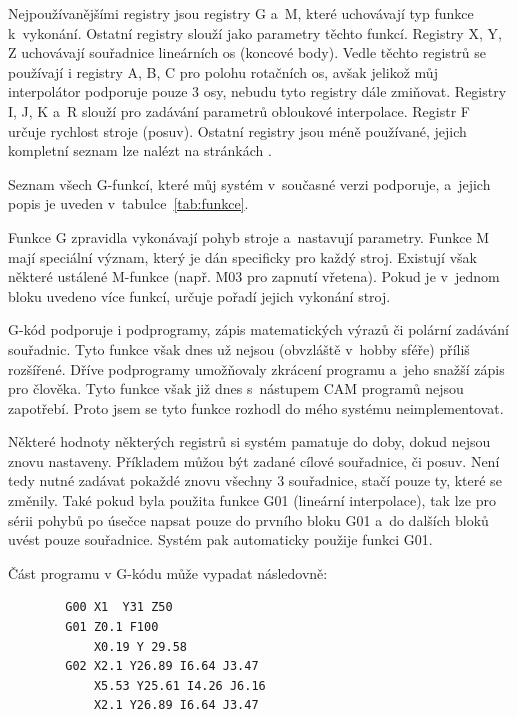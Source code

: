 		Nejpoužívanějšími registry jsou registry G a~M, které uchovávají typ funkce k~vykonání. Ostatní registry slouží jako parametry těchto funkcí. Registry X, Y, Z uchovávají souřadnice lineárních os (koncové body). Vedle těchto registrů se používají i registry A, B, C pro polohu rotačních os, avšak jelikož můj interpolátor podporuje pouze 3 osy, nebudu tyto registry dále zmiňovat. Registry I, J, K a~R slouží pro zadávání parametrů obloukové interpolace. Registr F určuje rychlost stroje (posuv). Ostatní registry jsou méně používané, jejich kompletní seznam lze nalézt na stránkách \cite{wiki:gcode}.
		
		Seznam všech G-funkcí, které můj systém v~současné verzi podporuje, a~jejich popis je uveden v~tabulce~\ref{tab:funkce}.
		
		Funkce G zpravidla vykonávají pohyb stroje a~nastavují parametry. Funkce M mají speciální význam, který je dán specificky pro každý stroj. Existují však některé ustálené M-funkce (např. M03 pro zapnutí vřetena\cite{wiki:gcode}). Pokud je v~jednom bloku uvedeno více funkcí, určuje pořadí jejich vykonání stroj.
		
		G-kód podporuje i podprogramy, zápis matematických výrazů či polární zadávání souřadnic. Tyto funkce však dnes už nejsou (obvzláště v~hobby sféře) příliš rozšířené. Dříve podprogramy umožňovaly zkrácení programu a~jeho snažší zápis pro člověka. Tyto funkce však již dnes s~nástupem CAM programů nejsou zapotřebí. Proto jsem se tyto funkce rozhodl do mého systému neimplementovat.
		
		Některé hodnoty některých registrů si systém pamatuje do doby, dokud nejsou znovu nastaveny. Příkladem můžou být zadané cílové souřadnice, či posuv. Není tedy nutné zadávat pokaždé znovu všechny 3 souřadnice, stačí pouze ty, které se změnily. Také pokud byla použita funkce G01 (lineární interpolace), tak lze pro sérii pohybů po úsečce napsat pouze do prvního bloku G01 a~do dalších bloků uvést pouze souřadnice. Systém pak automaticky použije funkci G01.
		
		Část programu v G-kódu může vypadat následovně:
		\begin{verbatim}
		G00 X1	Y31 Z50
		G01 Z0.1 F100
		    X0.19 Y 29.58
		G02 X2.1 Y26.89 I6.64 J3.47
		    X5.53 Y25.61 I4.26 J6.16
		    X2.1 Y26.89 I6.64 J3.47
		\end{verbatim}
		
